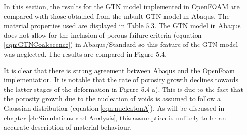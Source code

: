 \documentclass[sn-mathphys,Numbered,draft]{sn-jnl}%
\begin{document}
\begin{appendices}
In this section, the results for the GTN model implemented in OpenFOAM are compared with those obtained from the inbuilt GTN model in Abaqus. The material properties used are displayed in Table 5.3. The GTN model in Abaqus does not allow for the inclusion of porous failure criteria (equation \ref{eqn:GTNCoalescence}) in Abaqus/Standard so this feature of the GTN model was neglected. The results are compared in Figure 5.4. 

It is clear that there is strong agreement between Abaqus and the OpenFoam implementation. It is notable that the rate of porosity growth declines towards the latter stages of the deformation in Figure 5.4 a). This is due to the fact that the porosity growth due to the nucleation of voids is assumed to follow a Gaussian distribution (equation \ref{eqn:nucleatonA}). As will be discussed in chapter \ref{ch:Simulations and Analysis}, this assumption is unlikely to be an accurate description of material behaviour. 

\begin{figure}[htbp]
	\centering
		
		

\end{figure}
\end{appendices}
\end{document}
